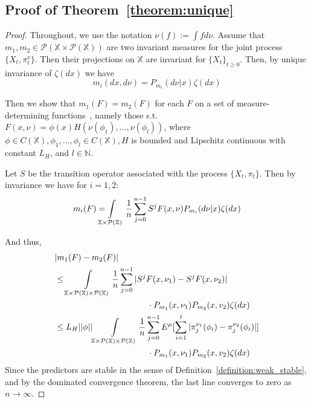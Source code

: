 \documentclass[conference, draftcls, onecolumn]{IEEEtran}
\begin{document}
\subsection*{\textbf{Proof of Theorem~\ref{theorem:unique}}}
\begin{proof}
    Throughout, we use the notation \( \nu(f) := \int fd\nu \). Assume that \( m_1,m_2 \in \mathcal{P}(\mathbb{X} \times \mathcal{P}(\mathbb{X})) \) are two invariant measures for the joint process \( \{X_t,\pi_t^\nu \} \). Then their projections on \( \mathbb{X} \) are invariant for \( \{X_t\}_{t\ge0} \). Then, by unique invariance of \( \zeta(dx) \) we have
    \[ m_i(dx,d\nu) = P_{m_i}(d\nu | x)\zeta(dx) \]

    Then we show that \( m_1(F) = m_2(F) \) for each \( F \) on a set of measure-determining functions~\cite{Stettner}, namely those s.t. \( F(x,\nu) = \phi(x)H(\nu(\phi_1),\ldots,\nu(\phi_l)) \), where \( \phi \in C(\mathbb{X}), \phi_1,\ldots,\phi_l \in C(\mathbb{X}), H \) is bounded and Lipschitz continuous with constant \( L_H \), and \( l \in \mathbb{N} \).

    Let \( S \) be the transition operator associated with the process \( \{X_t,\pi_t \} \). Then by invariance we have for \( i=1,2 \):
    \[ m_i(F) = \smashoperator[l]{\int\limits_{\mathbb{X} \times \mathcal{P}(\mathbb{X})}} \frac{1}{n}\sum_{j=0}^{n-1}S^j F(x,\nu)P_{m_i}(d\nu | x)\zeta(dx) \]

    And thus,
    \begin{align*}
         & |m_1(F) - m_2(F)|                                                                                                                                                                                                                     \\
         & \le \int\limits_{\mathbb{X} \times \mathcal{P}(\mathbb{X}) \times \mathcal{P}(\mathbb{X})} \frac{1}{n}\sum_{j=0}^{n-1} |S^j F(x,\nu_1) - S^j F(x,\nu_2)|                                                                              \\ & \hspace{11em}\cdot P_{m_1}(x,\nu_1)P_{m_2}(x,v_2)\zeta(dx) \\
         & \le L_H ||\phi|| \quad\quad \smashoperator[l]{\int\limits_{\mathbb{X} \times \mathcal{P}(\mathbb{X}) \times \mathcal{P}(\mathbb{X})}} \frac{1}{n}\sum_{j=0}^{n-1}E^\mu[\sum_{i=1}^{l}|\pi_j^{\nu_1}(\phi_i) - \pi_j^{\nu_2}(\phi_i)|] \\ &\hspace{11em}\cdot P_{m_1}(x,\nu_1)P_{m_2}(x,v_2)\zeta(dx)
    \end{align*}
    Since the predictors are stable in the sense of Definition~\ref{definition:weak_stable}, and by the dominated convergence theorem, the last line converges to zero as \( n \to \infty \).
\end{proof}
\end{document}
